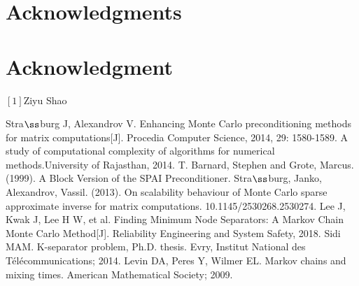 \documentclass[10pt,journal]{IEEEtran}
\begin{document}
  \section*{Acknowledgments}
\else
  \section*{Acknowledgment}
\fi


$[1]$Ziyu Shao

\ifCLASSOPTIONcaptionsoff
  \newpage
\fi



\begin{thebibliography}{1}
Stra$\ss$burg J, Alexandrov V. Enhancing Monte Carlo preconditioning methods for matrix computations[J]. Procedia Computer Science, 2014, 29: 1580-1589. 
A study of computational complexity of algorithms for numerical methods.University of Rajasthan, 2014.
T. Barnard, Stephen and Grote, Marcus. (1999). A Block Version of the SPAI Preconditioner. 
Stra$\ss$burg, Janko, Alexandrov, Vassil. (2013). On scalability behaviour of Monte Carlo sparse approximate inverse for matrix computations. 10.1145/2530268.2530274. 
Lee J, Kwak J, Lee H W, et al. Finding Minimum Node Separators: A Markov Chain Monte Carlo Method[J]. Reliability Engineering and System Safety, 2018.
Sidi MAM. K-separator problem, Ph.D. thesis. Evry, Institut National des
Télécommunications; 2014.
Levin DA, Peres Y, Wilmer EL. Markov chains and mixing times. American
Mathematical Society; 2009.
\end{thebibliography}

\end{document}
